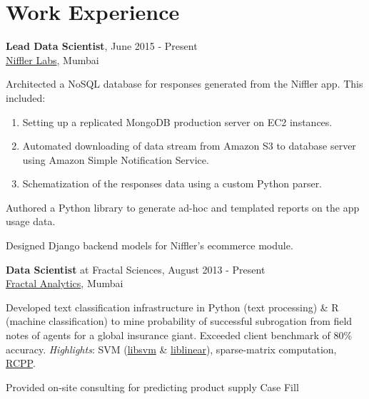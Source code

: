 \documentclass[a4paper,11pt]{article}
\renewenvironment{itemize}{
\begin{list}{}{
  \setlength{\leftmargin}{1.5em}
  }
  }{
\end{list}
}
\begin{document}
\section*{Work Experience}
\small{
\begin{itemize}
  \item \textbf{Lead Data Scientist}, June 2015 - Present \\
    \href{http://niffler.in}{Niffler Labs}, Mumbai
    \begin{itemize}
      \item Architected a NoSQL database for responses generated from the
        Niffler app. This included:
        \begin{enumerate}
            \item Setting up a replicated MongoDB production server on EC2
              instances.
            \item Automated downloading of data stream from Amazon S3 to
              database server using Amazon Simple Notification Service.
            \item Schematization of the responses data using a custom Python
              parser.
        \end{enumerate}
      \item Authored a Python library to generate ad-hoc and templated reports
        on the app usage data.
      \item Designed Django backend models for Niffler's ecommerce module.
    \end{itemize}
    \vspace*{\baselineskip} %
  \item \textbf{Data Scientist} at Fractal Sciences, August 2013 - Present \\
    \href{http://fractalanalytics.com}{Fractal Analytics}, Mumbai
    \begin{itemize}
      \item Developed text classification infrastructure in Python (text
        processing) \& R (machine classification) to mine probability of
        successful subrogation from field notes of agents for a global
        insurance giant. Exceeded client benchmark of 80\% accuracy.
        \emph{Highlights}: SVM
        (\href{http://www.csie.ntu.edu.tw/~cjlin/libsvm/}{libsvm} \&
        \href{http://www.csie.ntu.edu.tw/~cjlin/liblinear/}{liblinear}),
        sparse-matrix computation,
        \href{http://cran.r-project.org/web/packages/Rcpp/index.html}{RCPP}.
      \item Provided on-site consulting for predicting product supply Case Fill

\end{itemize}
\end{itemize}}
\end{document}
